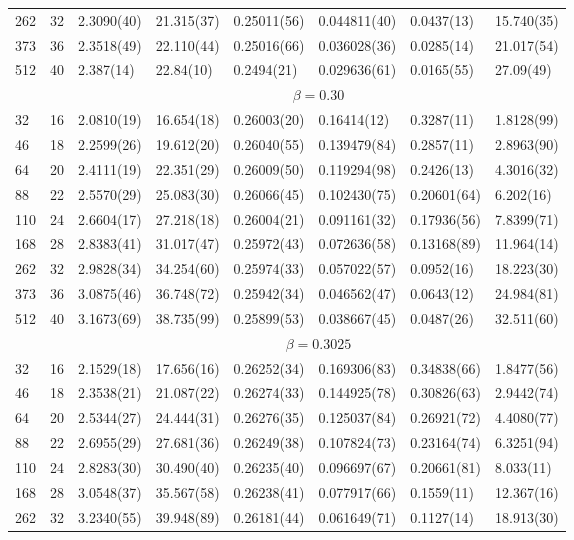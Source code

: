\documentclass[12pt]{article}
\begin{document}
\begin{table}
\begin{tabular}{llllllll}
262 & 32 & 2.3090(40) & 21.315(37) & 0.25011(56) & 0.044811(40) & 0.0437(13) & 15.740(35)\\ 
373 & 36 & 2.3518(49) & 22.110(44) & 0.25016(66) & 0.036028(36) & 0.0285(14) & 21.017(54)\\ 
512 & 40 & 2.387(14) & 22.84(10) & 0.2494(21) & 0.029636(61) & 0.0165(55) & 27.09(49)\\ 
\hline 
  & & \multicolumn{6}{c}{$ \beta = 0.30 $} \\ 
 \hline 
32 & 16 & 2.0810(19) & 16.654(18) & 0.26003(20) & 0.16414(12) & 0.3287(11) & 1.8128(99)\\ 
46 & 18 & 2.2599(26) & 19.612(20) & 0.26040(55) & 0.139479(84) & 0.2857(11) & 2.8963(90)\\ 
64 & 20 & 2.4111(19) & 22.351(29) & 0.26009(50) & 0.119294(98) & 0.2426(13) & 4.3016(32)\\ 
88 & 22 & 2.5570(29) & 25.083(30) & 0.26066(45) & 0.102430(75) & 0.20601(64) & 6.202(16)\\ 
110 & 24 & 2.6604(17) & 27.218(18) & 0.26004(21) & 0.091161(32) & 0.17936(56) & 7.8399(71)\\ 
168 & 28 & 2.8383(41) & 31.017(47) & 0.25972(43) & 0.072636(58) & 0.13168(89) & 11.964(14)\\ 
262 & 32 & 2.9828(34) & 34.254(60) & 0.25974(33) & 0.057022(57) & 0.0952(16) & 18.223(30)\\ 
373 & 36 & 3.0875(46) & 36.748(72) & 0.25942(34) & 0.046562(47) & 0.0643(12) & 24.984(81)\\ 
512 & 40 & 3.1673(69) & 38.735(99) & 0.25899(53) & 0.038667(45) & 0.0487(26) & 32.511(60)\\ 
\hline 
  & & \multicolumn{6}{c}{$ \beta = 0.3025 $} \\ 
 \hline 
32 & 16 & 2.1529(18) & 17.656(16) & 0.26252(34) & 0.169306(83) & 0.34838(66) & 1.8477(56)\\ 
46 & 18 & 2.3538(21) & 21.087(22) & 0.26274(33) & 0.144925(78) & 0.30826(63) & 2.9442(74)\\ 
64 & 20 & 2.5344(27) & 24.444(31) & 0.26276(35) & 0.125037(84) & 0.26921(72) & 4.4080(77)\\ 
88 & 22 & 2.6955(29) & 27.681(36) & 0.26249(38) & 0.107824(73) & 0.23164(74) & 6.3251(94)\\ 
110 & 24 & 2.8283(30) & 30.490(40) & 0.26235(40) & 0.096697(67) & 0.20661(81) & 8.033(11)\\ 
168 & 28 & 3.0548(37) & 35.567(58) & 0.26238(41) & 0.077917(66) & 0.1559(11) & 12.367(16)\\ 
262 & 32 & 3.2340(55) & 39.948(89) & 0.26181(44) & 0.061649(71) & 0.1127(14) & 18.913(30)\\ 

\end{tabular}
\end{table}
\end{document}
